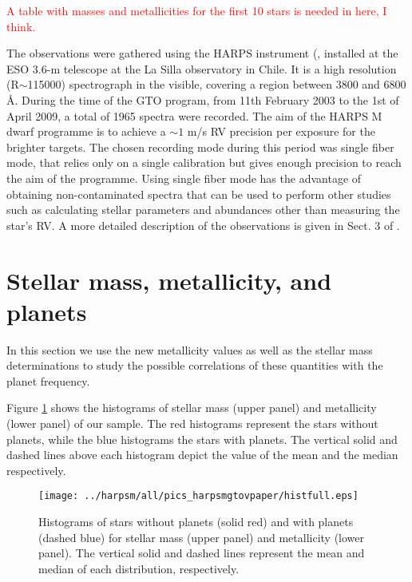 \documentclass[structabstract]{aa}
\begin{document}
\textcolor{red}{A table with masses and metallicities for the first 10 stars is needed in here, I think.}

The observations were gathered using the HARPS instrument (\citet{Mayor-2003b,Pepe-2004}, installed at the ESO 3.6-m telescope at the La Silla observatory in Chile. It is a high resolution (R$\sim$115000) spectrograph in the visible, covering a region between 3800 and 6800 \AA. During the time of the GTO program, from 11th February 2003 to the 1st of April 2009, a total of 1965 spectra were recorded. The aim of the HARPS M dwarf programme is to achieve a $\sim 1$ m/s RV precision per exposure for the brighter targets. The chosen recording mode during this period was single fiber mode, that relies only on a single calibration but gives enough precision to reach the aim of the programme. Using single fiber mode has the advantage of obtaining non-contaminated spectra that can be used to perform other studies such as calculating stellar parameters and abundances other than measuring the star's RV. A more detailed description of the observations is given in Sect. 3 of \citet{Bonfils-2011}.

\section{Stellar mass, metallicity, and planets}
\label{relation}

In this section we use the new metallicity values as well as the stellar mass determinations to study the possible correlations of these quantities with the planet frequency.

Figure \ref{histfull} shows the histograms of stellar mass (upper panel) and metallicity (lower panel) of our sample. The red histograms represent the stars without planets, while the blue histograms the stars with planets. The vertical solid and dashed lines above each histogram depict the value of the mean and the median respectively. %


\begin{figure}[h]
\begin{center}
\texttt{[image: ../harpsm/all/pics\_harpsmgtovpaper/histfull.eps]}
\end{center}
\caption{Histograms of stars without planets (solid red) and with planets (dashed blue) for stellar mass (upper panel) and metallicity (lower panel). The vertical solid and dashed lines represent the mean and median of each distribution, respectively.}
\label{histfull}
\end{figure}
\end{document}

